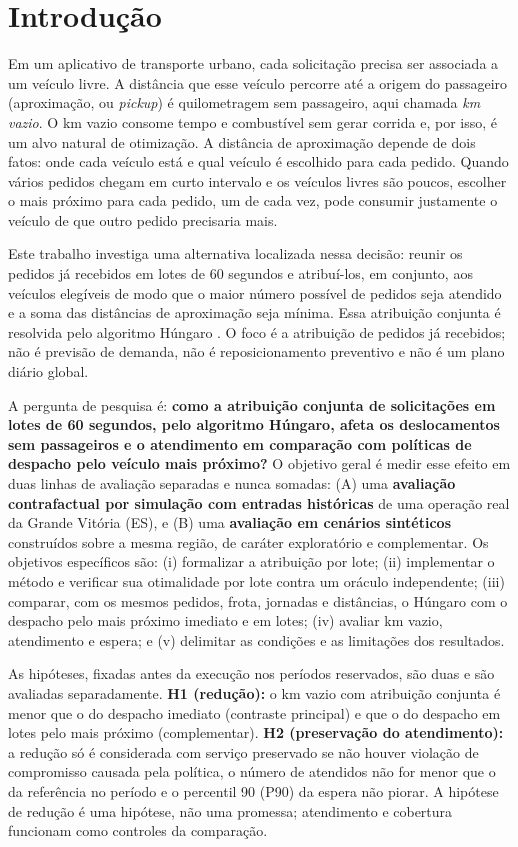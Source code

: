 \section{Introdução}

Em um aplicativo de transporte urbano, cada solicitação precisa ser associada a um veículo livre. A distância que esse veículo percorre até a origem do passageiro (aproximação, ou \textit{pickup}) é quilometragem sem passageiro, aqui chamada \textit{km vazio}. O km vazio consome tempo e combustível sem gerar corrida e, por isso, é um alvo natural de otimização. A distância de aproximação depende de dois fatos: onde cada veículo está e qual veículo é escolhido para cada pedido. Quando vários pedidos chegam em curto intervalo e os veículos livres são poucos, escolher o mais próximo para cada pedido, um de cada vez, pode consumir justamente o veículo de que outro pedido precisaria mais.

Este trabalho investiga uma alternativa localizada nessa decisão: reunir os pedidos já recebidos em lotes de 60 segundos e atribuí-los, em conjunto, aos veículos elegíveis de modo que o maior número possível de pedidos seja atendido e a soma das distâncias de aproximação seja mínima. Essa atribuição conjunta é resolvida pelo algoritmo Húngaro \cite{kuhn1955, munkres1957}. O foco é a atribuição de pedidos já recebidos; não é previsão de demanda, não é reposicionamento preventivo e não é um plano diário global.

A pergunta de pesquisa é: \textbf{como a atribuição conjunta de solicitações em lotes de 60 segundos, pelo algoritmo Húngaro, afeta os deslocamentos sem passageiros e o atendimento em comparação com políticas de despacho pelo veículo mais próximo?} O objetivo geral é medir esse efeito em duas linhas de avaliação separadas e nunca somadas: (A) uma \textbf{avaliação contrafactual por simulação com entradas históricas} de uma operação real da Grande Vitória (ES), e (B) uma \textbf{avaliação em cenários sintéticos} construídos sobre a mesma região, de caráter exploratório e complementar. Os objetivos específicos são: (i) formalizar a atribuição por lote; (ii) implementar o método e verificar sua otimalidade por lote contra um oráculo independente; (iii) comparar, com os mesmos pedidos, frota, jornadas e distâncias, o Húngaro com o despacho pelo mais próximo imediato e em lotes; (iv) avaliar km vazio, atendimento e espera; e (v) delimitar as condições e as limitações dos resultados.

As hipóteses, fixadas antes da execução nos períodos reservados, são duas e são avaliadas separadamente. \textbf{H1 (redução):} o km vazio com atribuição conjunta é menor que o do despacho imediato (contraste principal) e que o do despacho em lotes pelo mais próximo (complementar). \textbf{H2 (preservação do atendimento):} a redução só é considerada com serviço preservado se não houver violação de compromisso causada pela política, o número de atendidos não for menor que o da referência no período e o percentil 90 (P90) da espera não piorar. A hipótese de redução é uma hipótese, não uma promessa; atendimento e cobertura funcionam como controles da comparação.

